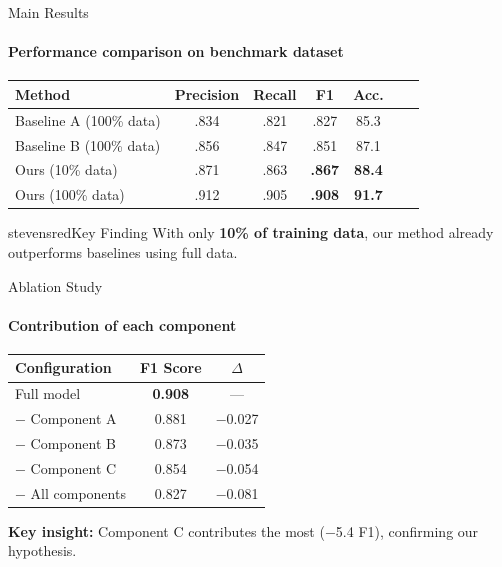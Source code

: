 
\begin{frame}{Main Results}
\framesubtitle{Performance comparison on benchmark dataset}

\begin{table}
\centering
\footnotesize
\setlength{\tabcolsep}{4pt}
\begin{tabular}{@{}lcccccc@{}}
\toprule
\textbf{Method} & \textbf{Precision} & \textbf{Recall} & \textbf{F1} & \textbf{Acc.} \\
\midrule
Baseline A (100\% data) & .834 & .821 & .827 & 85.3 \\
Baseline B (100\% data) & .856 & .847 & .851 & 87.1 \\
\midrule
Ours (10\% data) & .871 & .863 & \textbf{.867} & \textbf{88.4} \\
Ours (100\% data) & .912 & .905 & \textbf{.908} & \textbf{91.7} \\
\bottomrule
\end{tabular}
\end{table}

\vspace{0.8em}

\begin{colorblock}[white]{stevensred}{Key Finding}
With only \textbf{10\% of training data}, our method already outperforms baselines using full data.
\end{colorblock}

\end{frame}

\begin{frame}{Ablation Study}
\framesubtitle{Contribution of each component}

\begin{table}
\centering
\begin{tabular}{lcc}
\toprule
\textbf{Configuration} & \textbf{F1 Score} & \textbf{$\Delta$} \\
\midrule
Full model & \textbf{0.908} & --- \\
$-$ Component A & 0.881 & $-$0.027 \\
$-$ Component B & 0.873 & $-$0.035 \\
$-$ Component C & 0.854 & $-$0.054 \\
$-$ All components & 0.827 & $-$0.081 \\
\bottomrule
\end{tabular}
\end{table}

\vspace{0.5em}
\textbf{Key insight:} Component C contributes the most ($-$5.4 F1), confirming our hypothesis.
\end{frame}

